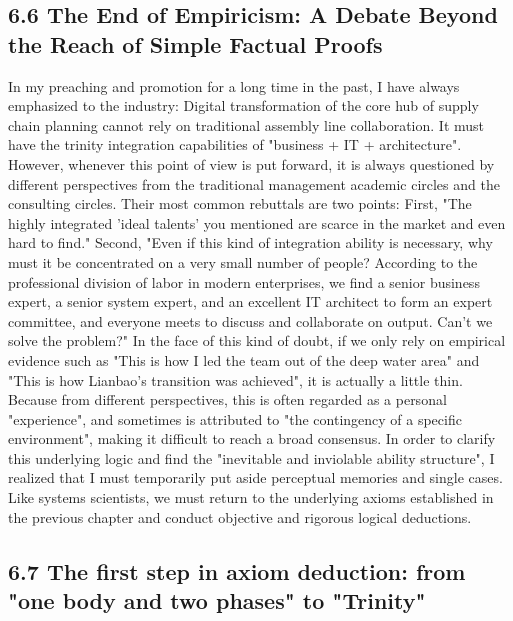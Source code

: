 \documentclass[11pt,a4paper]{article}
\begin{document}
\subsection*{6.6 The End of Empiricism: A Debate Beyond the Reach of Simple Factual Proofs}


In my preaching and promotion for a long time in the past, I have always emphasized to the industry: Digital transformation of the core hub of supply chain planning cannot rely on traditional assembly line collaboration. It must have the trinity integration capabilities of "business + IT + architecture". However, whenever this point of view is put forward, it is always questioned by different perspectives from the traditional management academic circles and the consulting circles. Their most common rebuttals are two points: First, "The highly integrated 'ideal talents' you mentioned are scarce in the market and even hard to find." Second, "Even if this kind of integration ability is necessary, why must it be concentrated on a very small number of people? According to the professional division of labor in modern enterprises, we find a senior business expert, a senior system expert, and an excellent IT architect to form an expert committee, and everyone meets to discuss and collaborate on output. Can't we solve the problem?" In the face of this kind of doubt, if we only rely on empirical evidence such as "This is how I led the team out of the deep water area" and "This is how Lianbao's transition was achieved", it is actually a little thin. Because from different perspectives, this is often regarded as a personal "experience", and sometimes is attributed to "the contingency of a specific environment", making it difficult to reach a broad consensus. In order to clarify this underlying logic and find the "inevitable and inviolable ability structure", I realized that I must temporarily put aside perceptual memories and single cases. Like systems scientists, we must return to the underlying axioms established in the previous chapter and conduct objective and rigorous logical deductions.


\subsection*{6.7 The first step in axiom deduction: from "one body and two phases" to "Trinity"}
\end{document}
